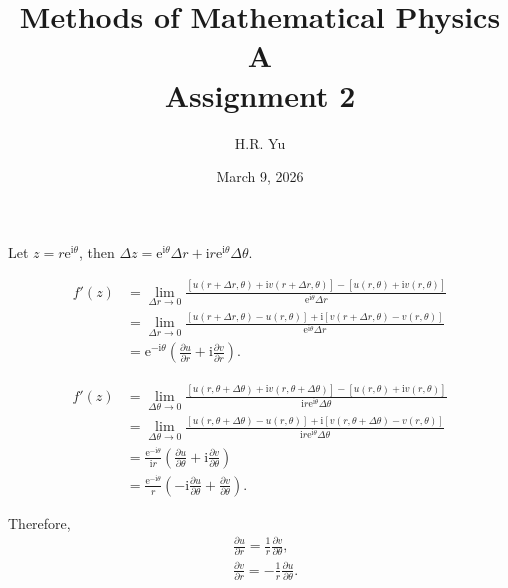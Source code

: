 \documentclass[12pt]{article}
\title{Methods of Mathematical Physics A\\Assignment 2}
\author{H.R. Yu}
\date{March 9, 2026}
\begin{document}
\maketitle

\section{}
Let \( z = r \mathrm{e}^{\mathrm{i}\theta} \), then \( \Delta z = \mathrm{e}^{\mathrm{i}\theta} \Delta r + \mathrm{i} r \mathrm{e}^{\mathrm{i}\theta} \Delta \theta \).

\begin{align*}
f'(z) &= \lim_{\Delta r \to 0} \frac{[u(r+\Delta r, \theta) + \mathrm{i} v(r+\Delta r, \theta)] - [u(r, \theta) + \mathrm{i} v(r, \theta)]}{\mathrm{e}^{\mathrm{i}\theta} \Delta r} \\
&= \lim_{\Delta r \to 0} \frac{[u(r+\Delta r, \theta) - u(r, \theta)] + \mathrm{i} [v(r+\Delta r, \theta) - v(r, \theta)]}{\mathrm{e}^{\mathrm{i}\theta} \Delta r} \\
&= \mathrm{e}^{-\mathrm{i}\theta} \left( \frac{\partial u}{\partial r} + \mathrm{i} \frac{\partial v}{\partial r} \right).
\end{align*}

\begin{align*}
f'(z) &= \lim_{\Delta \theta \to 0} \frac{[u(r, \theta+\Delta \theta) + \mathrm{i} v(r, \theta+\Delta \theta)] - [u(r, \theta) + \mathrm{i} v(r, \theta)]}{\mathrm{i} r \mathrm{e}^{\mathrm{i}\theta} \Delta \theta} \\
&= \lim_{\Delta \theta \to 0} \frac{[u(r, \theta+\Delta \theta) - u(r, \theta)] + \mathrm{i} [v(r, \theta+\Delta \theta) - v(r, \theta)]}{\mathrm{i} r \mathrm{e}^{\mathrm{i}\theta} \Delta \theta} \\
&= \frac{\mathrm{e}^{-\mathrm{i}\theta}}{\mathrm{i} r} \left( \frac{\partial u}{\partial \theta} + \mathrm{i} \frac{\partial v}{\partial \theta} \right) \\&= \frac{\mathrm{e}^{-\mathrm{i}\theta}}{r} \left( -\mathrm{i} \frac{\partial u}{\partial \theta} + \frac{\partial v}{\partial \theta} \right).
\end{align*}

Therefore,
\begin{align*}
&\frac{\partial u}{\partial r} = \frac{1}{r} \frac{\partial v}{\partial \theta}, \\
&\frac{\partial v}{\partial r} = -\frac{1}{r} \frac{\partial u}{\partial \theta}.
\end{align*}
\end{document}
